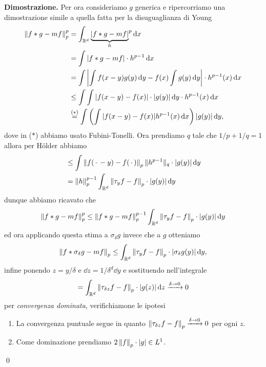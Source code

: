 \textbf{Dimostrazione.}
Per ora consideriamo $g$ generica e ripercorriamo una dimostrazione simile a quella fatta per la disuguaglianza di Young
$$
\begin{aligned}
	\left\lVert f \ast g - m f \right\rVert_p^p 
	&= \int_{\mathbb R^d} {\underbrace{|f \ast g - m f|}_h}^p \,\mathrm{d} x \\
	&= \int |f \ast g - m f| \cdot h^{p-1} \,\mathrm{d} x \\
	&= \int \left| \int f(x - y) g(y) \,\mathrm{d} y - f(x) \int g(y) \,\mathrm{d} y \right| \cdot h^{p-1}(x) \,\mathrm{d} x \\
	&\leq \int \int |f(x - y) - f(x)| \cdot |g(y)| \,\mathrm{d} y \cdot h^{p-1}(x) \,\mathrm{d} x \\
	&\overset{\text{($*$)}}{=} \int \left(\int |f(x - y) - f(x)| h^{p-1}(x) \,\mathrm{d} x \right) |g(y)| \,\mathrm{d} y,
\end{aligned}
$$
dove in ($*$) abbiamo usato Fubini-Tonelli. Ora prendiamo $q$ tale che $1/p + 1/q = 1$ allora per H\"older abbiamo
$$
\begin{aligned}
	&\leq \int \left\lVert f(\,\cdot\, - y) - f(\,\cdot\,) \right\rVert_p \| h^{p-1} \|_q \cdot |g(y)| \,\mathrm{d} y \\
	&= \left\lVert h \right\rVert_p^{p-1} \int_{\mathbb R^d} \left\lVert \tau_y f - f \right\rVert_p \cdot |g(y)| \,\mathrm{d} y \\
\end{aligned}
$$
dunque abbiamo ricavato che
$$
\left\lVert f \ast g - m f \right\rVert_p^p 
\leq \left\lVert f \ast g - m f \right\rVert_p^{p-1} \int_{\mathbb R^d} \left\lVert \tau_y f - f \right\rVert_p \cdot |g(y)| \,\mathrm{d} y
$$
ed ora applicando questa stima a $\sigma_\delta g$ invece che a $g$ otteniamo
$$
\left\lVert f \ast \sigma_\delta g - m f \right\rVert_p
\leq \int_{\mathbb R^d} \left\lVert \tau_y f - f \right\rVert_p \cdot |\sigma_\delta g(y)| \,\mathrm{d} y,
$$
infine ponendo $z = y / \delta$ e $\dd z = 1/\delta^d \dd y$ e sostituendo nell'integrale
$$
= \int_{\mathbb R^d} \left\lVert \tau_{\delta z} f - f \right\rVert_p \cdot |g(z)| \,\mathrm{d} z \xrightarrow{\delta \to 0} 0
$$
per \textit{convergenza dominata}, verifichiamone le ipotesi
\begin{enumerate}
	\item La convergenza puntuale segue in quanto $\left\lVert \tau_{\delta z} f - f \right\rVert_p \xrightarrow{\delta \to 0} 0$ per ogni $z$.
	\item Come dominazione prendiamo $2 \left\lVert f \right\rVert_p \cdot |g| \in L^1$.
\end{enumerate}
\qed

\vss

